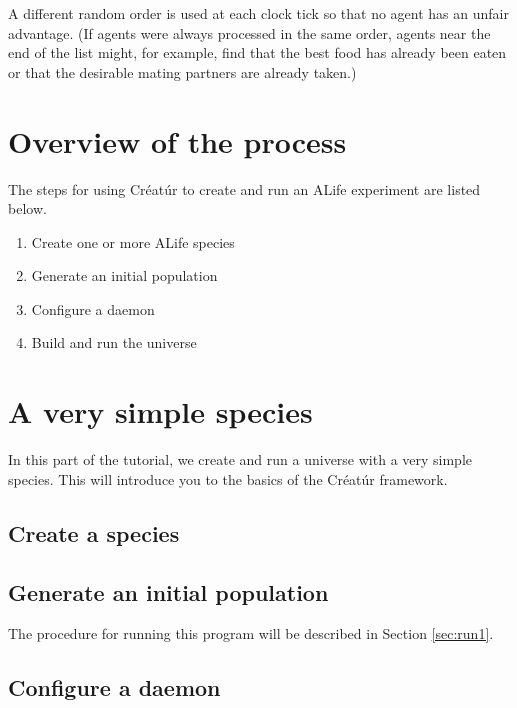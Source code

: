 \documentclass[a4paper,10pt]{report}
\begin{document}
A different random order is used at each clock tick
so that no agent has an unfair advantage.
(If agents were always processed in the same order, 
agents near the end of the list might, for example, find that the 
best food has already been eaten or that the desirable mating
partners are already taken.)

\chapter{Overview of the process}

The steps for using Créatúr to create and run an ALife experiment
are listed below.

\begin{enumerate}
\item Create one or more ALife species
\item Generate an initial population
\item Configure a daemon
\item Build and run the universe
\end {enumerate}

\chapter{A very simple species}
\label{sec:rock}

In this part of the tutorial, we create and run a universe
with a very simple species.
This will introduce you to the basics of the Créatúr framework.

\section{Create a species}
\label{sec:species1}



\section{Generate an initial population}
\label{sec:pop1}



The procedure for running this program will be described in Section 
\ref{sec:run1}.

\section{Configure a daemon}
\label{sec:daemon1}
\end{document}
